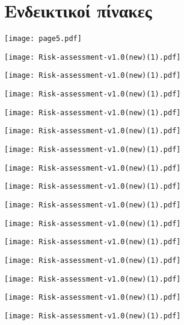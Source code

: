 \documentclass[12pt,a4paper,oneside]{article}
\begin{document}
\section{Ενδεικτικοί πίνακες}\label{sec:intro}
\pagestyle{fancy}
\centerline{\texttt{[image: page5.pdf]}}
\centerline{\texttt{[image: Risk-assessment-v1.0(new)(1).pdf]}}
\centerline{\texttt{[image: Risk-assessment-v1.0(new)(1).pdf]}}
\centerline{\texttt{[image: Risk-assessment-v1.0(new)(1).pdf]}}
\centerline{\texttt{[image: Risk-assessment-v1.0(new)(1).pdf]}}
\centerline{\texttt{[image: Risk-assessment-v1.0(new)(1).pdf]}}
\centerline{\texttt{[image: Risk-assessment-v1.0(new)(1).pdf]}}
\centerline{\texttt{[image: Risk-assessment-v1.0(new)(1).pdf]}}
\centerline{\texttt{[image: Risk-assessment-v1.0(new)(1).pdf]}}
\centerline{\texttt{[image: Risk-assessment-v1.0(new)(1).pdf]}}
\centerline{\texttt{[image: Risk-assessment-v1.0(new)(1).pdf]}}
\centerline{\texttt{[image: Risk-assessment-v1.0(new)(1).pdf]}}
\centerline{\texttt{[image: Risk-assessment-v1.0(new)(1).pdf]}}
\centerline{\texttt{[image: Risk-assessment-v1.0(new)(1).pdf]}}
\centerline{\texttt{[image: Risk-assessment-v1.0(new)(1).pdf]}}
\centerline{\texttt{[image: Risk-assessment-v1.0(new)(1).pdf]}}


\end{document}
